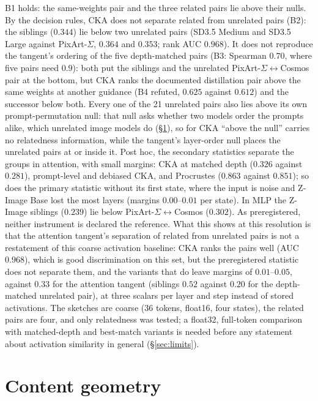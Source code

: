 \documentclass[11pt]{article}
\begin{document}
B1 holds: the same-weights pair and the three related pairs lie above their nulls. By the decision rules, CKA does not separate related from unrelated pairs (B2): the siblings ($0.344$) lie below two unrelated pairs (SD3.5 Medium and SD3.5 Large against PixArt-$\Sigma$, $0.364$ and $0.353$; rank AUC $0.968$). It does not reproduce the tangent's ordering of the five depth-matched pairs (B3: Spearman $0.70$, where five pairs need $0.9$): both put the siblings and the unrelated PixArt-$\Sigma$$\leftrightarrow$Cosmos pair at the bottom, but CKA ranks the documented distillation pair above the same weights at another guidance (B4 refuted, $0.625$ against $0.612$) and the successor below both. Every one of the 21 unrelated pairs also lies above its own prompt-permutation null: that null asks whether two models order the prompts alike, which unrelated image models do (\S\ref{sec:content}), so for CKA ``above the null'' carries no relatedness information, while the tangent's layer-order null places the unrelated pairs at or inside it. Post hoc, the secondary statistics separate the groups in attention, with small margins: CKA at matched depth ($0.326$ against $0.281$), prompt-level and debiased CKA, and Procrustes ($0.863$ against $0.851$); so does the primary statistic without its first state, where the input is noise and Z-Image Base lost the most layers (margins $0.00$--$0.01$ per state). In MLP the Z-Image siblings ($0.239$) lie below PixArt-$\Sigma$$\leftrightarrow$Cosmos ($0.302$). As preregistered, neither instrument is declared the reference. What this shows at this resolution is that the attention tangent's separation of related from unrelated pairs is not a restatement of this coarse activation baseline: CKA ranks the pairs well (AUC $0.968$), which is good discrimination on this set, but the preregistered statistic does not separate them, and the variants that do leave margins of $0.01$--$0.05$, against $0.33$ for the attention tangent (siblings $0.52$ against $0.20$ for the depth-matched unrelated pair), at three scalars per layer and step instead of stored activations. The sketches are coarse (36 tokens, float16, four states), the related pairs are four, and only relatedness was tested; a float32, full-token comparison with matched-depth and best-match variants is needed before any statement about activation similarity in general (\S\ref{sec:limits}).

\FloatBarrier
\section{Content geometry}\label{sec:content}
\end{document}
